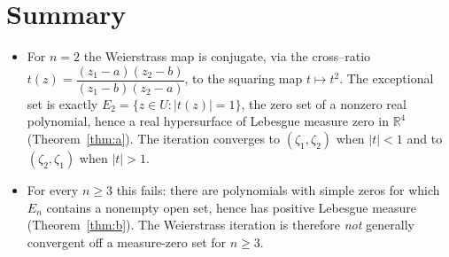 \documentclass{amsart}
\theoremstyle{definition}
\theoremstyle{remark}
\newcommand{\R}{\mathbb{R}}
\begin{document}
\section{Summary}

\begin{itemize}
\item For $n=2$ the Weierstrass map is conjugate, via the cross--ratio
$t(z)=\dfrac{(z_1-a)(z_2-b)}{(z_1-b)(z_2-a)}$, to the squaring map $t\mapsto t^{2}$. The
exceptional set is exactly $E_2=\{z\in U:|t(z)|=1\}$, the zero set of a nonzero real
polynomial, hence a real hypersurface of Lebesgue measure zero in $\R^4$
(Theorem~\ref{thm:a}). The iteration converges to $(\zeta_1,\zeta_2)$ when $|t|<1$ and to
$(\zeta_2,\zeta_1)$ when $|t|>1$.
\item For every $n\ge3$ this fails: there are polynomials with simple zeros for which $E_n$
contains a nonempty open set, hence has positive Lebesgue measure (Theorem~\ref{thm:b}). The
Weierstrass iteration is therefore \emph{not} generally convergent off a measure-zero set for
$n\ge3$.
\end{itemize}
\end{document}
